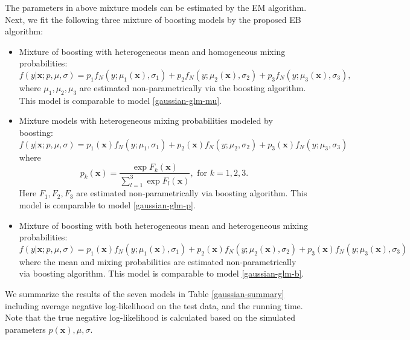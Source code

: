\documentclass[11pt]{article}
\numberwithin{equation}{section}
\def\bx{\boldsymbol{x}}
\begin{document}
The parameters in above mixture models can be estimated by the EM algorithm. Next, we fit the following three mixture of boosting models by the proposed EB algorithm:
\begin{itemize}
\item Mixture of boosting with heterogeneous mean and homogeneous mixing probabilities:
\begin{equation}\label{gaussian-bst-mu}
	f(y|\bx;p,\mu,\sigma)=p_1f_N(y;\mu_1(\bx),\sigma_1)+p_2f_N(y;\mu_2(\bx),\sigma_2)+p_3f_N(y;\mu_3(\bx),\sigma_3),
\end{equation}
where $\mu_1,\mu_2,\mu_3$ are estimated non-parametrically via the boosting algorithm. This model is comparable to model \eqref{gaussian-glm-mu}.

\item Mixture models with heterogeneous mixing probabilities modeled by boosting:
\begin{equation}\label{gaussian-bst-p}
	f(y|\bx;p,\mu,\sigma)=p_1(\bx)f_N(y;\mu_1,\sigma_1)+p_2(\bx)f_N(y;\mu_2,\sigma_2)+p_3(\bx)f_N(y;\mu_3,\sigma_3)
\end{equation}
where
\begin{equation}\label{bst-p}
	p_k(\bx)=\frac{\exp{F_k(\bx)}}{\sum_{l=1}^{3}\exp{F_l(\bx)}}, \text{ for } k=1,2,3.
\end{equation}
Here $F_1,F_2,F_3$ are estimated non-parametrically via boosting algorithm. This model is comparable to model \eqref{gaussian-glm-p}.

\item Mixture of boosting with both heterogeneous mean and heterogeneous mixing probabilities:
\begin{equation}\label{gaussian-bst-b}
	f(y|\bx;p,\mu,\sigma)=p_1(\bx)f_N(y;\mu_1(\bx),\sigma_1)+p_2(\bx)f_N(y;\mu_2(\bx),\sigma_2)+p_3(\bx)f_N(y;\mu_3(\bx),\sigma_3)
\end{equation}
where the mean and mixing probabilities are estimated non-parametrically via boosting algorithm. This model is comparable to model \eqref{gaussian-glm-b}.

\end{itemize}
We summarize the results of the seven models in Table \ref{gaussian-summary} including average negative log-likelihood on the test data, and the running time. 
Note that the true negative log-likelihood is calculated based on the simulated parameters $p(\bx), \mu,\sigma$.
\end{document}
